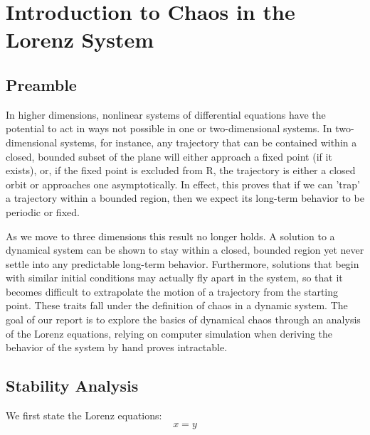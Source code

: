 \documentclass{report}
\begin{document}
\chapter{Introduction to Chaos in the Lorenz System}
\section{Preamble}
In higher dimensions, nonlinear systems of differential equations have the
potential to act in ways not possible in one or two-dimensional systems. In 
two-dimensional systems, for instance, any trajectory that can be contained within a closed, bounded subset of the plane will either approach a fixed point
(if it exists), or, if the fixed point is excluded from R, the trajectory is
either a closed orbit or approaches one asymptotically. In effect, this proves
that if we can 'trap' a trajectory within a bounded region, then we expect its 
long-term behavior to be periodic or fixed.
	
As we move to three dimensions this result no longer holds. A solution to a
dynamical system can be shown to stay within a closed, bounded region yet
never settle into any predictable long-term behavior. Furthermore, solutions 
that begin with similar initial conditions may actually fly apart in the 
system, so that it becomes difficult to extrapolate the motion of a trajectory 
from the starting point. These traits fall under the definition of chaos in a
dynamic system. The goal of our report is to explore the basics of dynamical 
chaos through an analysis of the Lorenz equations, relying on computer
simulation when deriving the behavior of the system by hand proves intractable.

\section{Stability Analysis}

We first state the Lorenz equations:
\[ x = y\]
\end{document}
